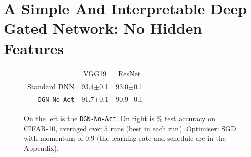 \section{A Simple And Interpretable Deep Gated  Network: No Hidden Features}\label{sec:whitebox}
\begin{figure}
\centering
\begin{minipage}{0.3\columnwidth}
\centering
{}
\end{minipage}
\begin{minipage}{0.4\columnwidth}
\begin{tabular}{rcc}
\toprule
&VGG19 & ResNet\\
Standard DNN&93.4\tiny{$\pm$0.1} &93.0\tiny{$\pm$0.1} \\
\texttt{DGN-No-Act}&91.7\tiny{$\pm$0.1}&90.9\tiny{$\pm$0.1} \\
\bottomrule
\end{tabular}
\end{minipage}
\caption{\small On the left is the \texttt{DGN-No-Act}. On right is $\%$ test accuracy on CIFAR-10, averaged over $5$ runs (best in each run). Optimiser: SGD with momentum of 0.9 (the learning rate and schedule are in the Appendix).}
\label{fig:dgn-no-act}
\end{figure}
